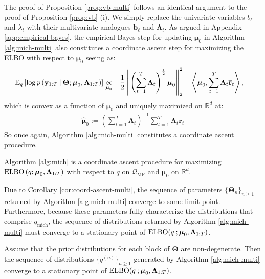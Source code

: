 The proof of Proposition \ref{prop:vb-multi} follows an identical argument to the proof of Proposition \ref{prop:vb} (i). We simply replace the univariate variables $b_{\ell}$ and $\lambda_t$ with their multivariate analogues $\mathbf{b}_{\ell}$ and $\boldsymbol{\Lambda}_t$. As argued in Appendix \ref{app:empirical-bayes}, the empirical Bayes step for updating $\boldsymbol{\mu}_0$ in Algorithm \ref{alg:mich-multi} also constitutes a coordinate ascent step for maximizing the ELBO with respect to $\boldsymbol{\mu}_0$ seeing as:
\begin{align*}
     \mathbb{E}_{q} \left[\log p\left(\mathbf{y}_{1:T} \:|\: \boldsymbol{\Theta};\boldsymbol{\mu}_0,\boldsymbol{\Lambda}_{1:T}\right)\right] &\underset{\boldsymbol{\mu}_0}{\propto} -\frac{1}{2} \left\lVert\left( \sum_{t=1}^T \boldsymbol{\Lambda}_t\right)^{\frac{1}{2}}\boldsymbol{\mu}_0\right\rVert_2^2 +\left\langle\boldsymbol{\mu}_0, \sum_{t=1}^T\boldsymbol{\Lambda}_t\overline{\mathbf{r}}_t \right\rangle,
\end{align*}
which is convex as a function of $\boldsymbol{\mu}_0$ and uniquely maximized on $\mathbb{R}^d$ at:
\begin{align*}
    \hat{\boldsymbol{\mu}}_0 := \left(\sum_{t=1}^T\boldsymbol{\Lambda}_t\right)^{-1}\sum_{t=1}^T\boldsymbol{\Lambda}_t\overline{\mathbf{r}}_t
\end{align*}
So once again, Algorithm \ref{alg:mich-multi} constitutes a coordinate ascent procedure.
\begin{corollary}
\label{cor:coord-ascent-multi}
Algorithm \ref{alg:mich} is a coordinate ascent procedure for maximizing $\text{\normalfont ELBO}\left(q;\boldsymbol{\mu}_0,\boldsymbol{\Lambda}_{1:T}\right)$ with respect to $q$ on $\mathcal{Q}_{\text{MF}}$ and $\boldsymbol{\mu}_0$ on $\mathbb{R}^d$.
\end{corollary}
\vspace{-10pt}

Due to Corollary \ref{cor:coord-ascent-multi}, the sequence of parameters $\{\overline{\boldsymbol{\Theta}}_{n}\}_{n \geq 1}$ returned by Algorithm \ref{alg:mich-multi} converge to some limit point. Furthermore, because these parameters fully characterize the distributions that comprise $q_{\text{mich}}$, the sequence of distributions returned by Algorithm \ref{alg:mich-multi} must converge to a stationary point of $\text{\normalfont ELBO}(q\:;\boldsymbol{\mu}_0, \boldsymbol{\Lambda}_{1:T})$. 

\begin{proposition}
\label{prop:stationary-point-multi}
Assume that the prior distributions for each block of $\boldsymbol{\Theta}$ are non-degenerate. Then the sequence of distributions $\{q^{(n)}\}_{n\geq 1}$ generated by Algorithm \ref{alg:mich-multi} converge to a stationary point of $\text{\normalfont ELBO}(q\:;\boldsymbol{\mu}_0, \boldsymbol{\Lambda}_{1:T})$.
\end{proposition}
\vspace{-10pt}

